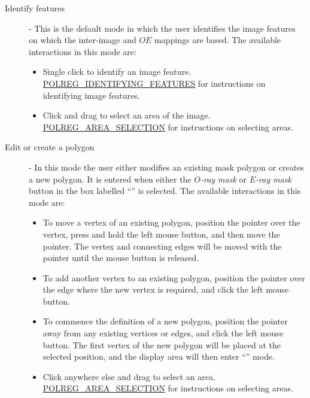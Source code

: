 \begin{description}

\item [ Identify features] - This is the default
mode in which the user identifies the image features on which the
inter-image and $OE$ mappings are based. The available interactions in
this mode are:

\begin{itemize}

\item Single click to identify an image feature. \hyperref{Go here}{See
section }{}{POLREG_IDENTIFYING_FEATURES} for instructions on identifying 
image features. 

\item Click and drag to select an area of the image. \hyperref{Go here}{See
section }{}{POLREG_AREA_SELECTION} for instructions on selecting areas.

\end{itemize}

\item [ Edit or create a polygon] - In this mode
the user either modifies an existing mask polygon or creates a new
polygon. It is entered when either the {\em $O$-ray mask} or {\em $E$-ray
mask} button in the box labelled ``'' is selected. The available interactions in
this mode are:

\begin{itemize}

\item To move a vertex of an existing polygon, position the pointer over
the vertex, press and hold the left mouse button, and then move the
pointer. The vertex and connecting edges will be moved with the pointer
until the mouse button is released.

\item To add another vertex to an existing polygon, position the pointer 
over the edge where the new vertex is required, and click the left mouse
button. 

\item To commence the definition of a new polygon, position the pointer
away from any existing vertices or edges, and click the left mouse button.
The first vertex of the new polygon will be placed at the selected
position, and the display area will then enter ``'' mode.

\item Click anywhere else and drag to select an area. \hyperref{Go here}{See
section }{}{POLREG_AREA_SELECTION} for instructions on selecting areas.


\end{itemize}
\end{description}
